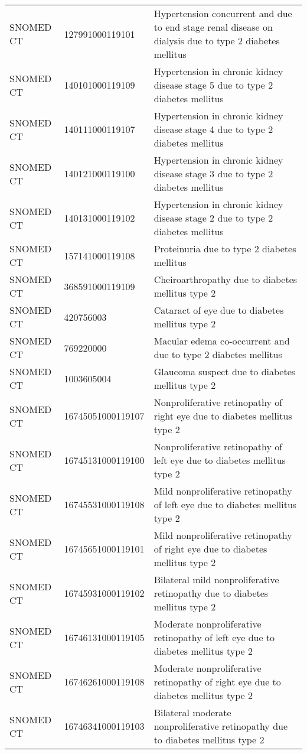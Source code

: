 \begin{longtable}{p{}p{}p{}}
  SNOMED CT & 127991000119101 & Hypertension concurrent and due to end stage renal disease on dialysis due to type 2 diabetes mellitus \\ 
  SNOMED CT & 140101000119109 & Hypertension in chronic kidney disease stage 5 due to type 2 diabetes mellitus \\ 
  SNOMED CT & 140111000119107 & Hypertension in chronic kidney disease stage 4 due to type 2 diabetes mellitus \\ 
  SNOMED CT & 140121000119100 & Hypertension in chronic kidney disease stage 3 due to type 2 diabetes mellitus \\ 
  SNOMED CT & 140131000119102 & Hypertension in chronic kidney disease stage 2 due to type 2 diabetes mellitus \\ 
  SNOMED CT & 157141000119108 & Proteinuria due to type 2 diabetes mellitus \\ 
  SNOMED CT & 368591000119109 & Cheiroarthropathy due to diabetes mellitus type 2 \\ 
  SNOMED CT & 420756003 & Cataract of eye due to diabetes mellitus type 2 \\ 
  SNOMED CT & 769220000 & Macular edema co-occurrent and due to type 2 diabetes mellitus \\ 
  SNOMED CT & 1003605004 & Glaucoma suspect due to diabetes mellitus type 2 \\ 
  SNOMED CT & 16745051000119107 & Nonproliferative retinopathy of right eye due to diabetes mellitus type 2 \\ 
  SNOMED CT & 16745131000119100 & Nonproliferative retinopathy of left eye due to diabetes mellitus type 2 \\ 
  SNOMED CT & 16745531000119108 & Mild nonproliferative retinopathy of left eye due to diabetes mellitus type 2 \\ 
  SNOMED CT & 16745651000119101 & Mild nonproliferative retinopathy of right eye due to diabetes mellitus type 2 \\ 
  SNOMED CT & 16745931000119102 & Bilateral mild nonproliferative retinopathy due to diabetes mellitus type 2 \\ 
  SNOMED CT & 16746131000119105 & Moderate nonproliferative retinopathy of left eye due to diabetes mellitus type 2 \\ 
  SNOMED CT & 16746261000119108 & Moderate nonproliferative retinopathy of right eye due to diabetes mellitus type 2 \\ 
  SNOMED CT & 16746341000119103 & Bilateral moderate nonproliferative retinopathy due to diabetes mellitus type 2 \\ 

\end{longtable}
